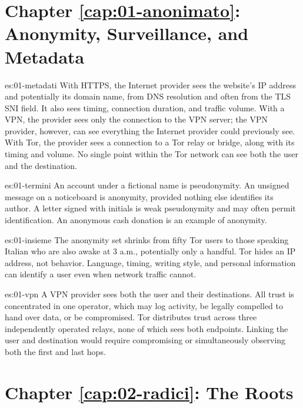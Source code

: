 \section*{Chapter \ref{cap:01-anonimato}: Anonymity, Surveillance, and Metadata}

\begin{soluzione}{es:01-metadati}
With HTTPS, the Internet provider sees the website's IP address and potentially its domain name, from DNS resolution and often from the TLS SNI field. It also sees timing, connection duration, and traffic volume. With a VPN, the provider sees only the connection to the VPN server; the VPN provider, however, can see everything the Internet provider could previously see. With Tor, the provider sees a connection to a Tor relay or bridge, along with its timing and volume. No single point within the Tor network can see both the user and the destination.
\end{soluzione}

\begin{soluzione}{es:01-termini}
An account under a fictional name is pseudonymity. An unsigned message on a noticeboard is anonymity, provided nothing else identifies its author. A letter signed with initials is weak pseudonymity and may often permit identification. An anonymous cash donation is an example of anonymity.
\end{soluzione}

\begin{soluzione}{es:01-insieme}
The anonymity set shrinks from fifty Tor users to those speaking Italian who are also awake at 3 a.m., potentially only a handful. Tor hides an IP address, not behavior. Language, timing, writing style, and personal information can identify a user even when network traffic cannot.
\end{soluzione}

\begin{soluzione}{es:01-vpn}
A VPN provider sees both the user and their destinations. All trust is concentrated in one operator, which may log activity, be legally compelled to hand over data, or be compromised. Tor distributes trust across three independently operated relays, none of which sees both endpoints. Linking the user and destination would require compromising or simultaneously observing both the first and last hops.
\end{soluzione}

\section*{Chapter \ref{cap:02-radici}: The Roots}

